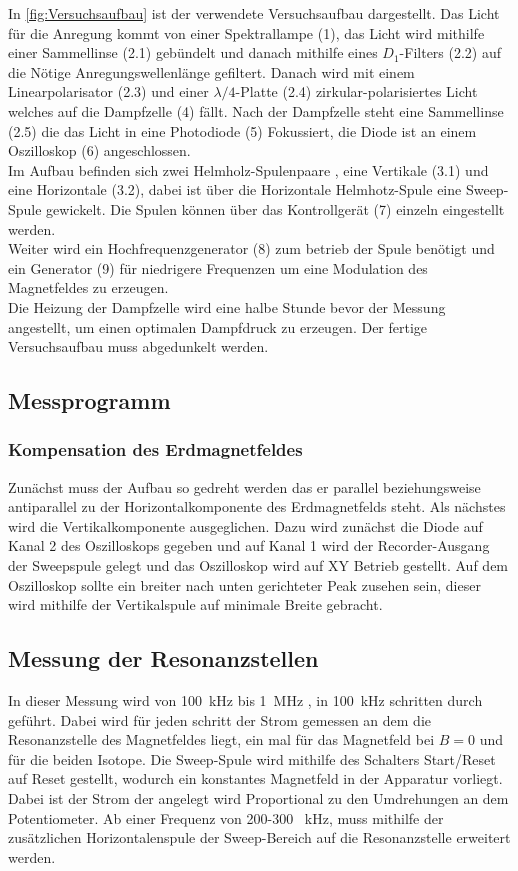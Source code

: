In \cref{fig:Versuchsaufbau} ist der verwendete Versuchsaufbau dargestellt.
Das Licht für die Anregung kommt von einer Spektrallampe (1), das Licht wird mithilfe einer Sammellinse (2.1) gebündelt und danach mithilfe eines $D_1$-Filters (2.2) auf die Nötige Anregungswellenlänge gefiltert. 
Danach wird mit einem Linearpolarisator (2.3) und einer $\lambda/4$-Platte (2.4) zirkular-polarisiertes Licht welches auf die Dampfzelle (4) fällt. Nach der Dampfzelle steht eine Sammellinse (2.5) die das Licht in eine Photodiode (5) Fokussiert, die Diode ist an einem Oszilloskop (6) angeschlossen.\\
Im Aufbau befinden sich zwei Helmholz-Spulenpaare , eine Vertikale (3.1) und eine Horizontale (3.2), dabei ist über die Horizontale Helmhotz-Spule eine Sweep-Spule gewickelt.
Die Spulen können über das Kontrollgerät (7) einzeln eingestellt werden.\\
Weiter wird ein Hochfrequenzgenerator (8) zum betrieb der Spule benötigt und ein Generator (9) für niedrigere Frequenzen um eine Modulation des Magnetfeldes zu erzeugen.\\
Die Heizung der Dampfzelle wird eine halbe Stunde bevor der Messung angestellt, um einen optimalen Dampfdruck zu erzeugen.
Der fertige Versuchsaufbau muss abgedunkelt werden.\\
\subsection{Messprogramm}
\subsubsection{Kompensation des Erdmagnetfeldes}
Zunächst muss der Aufbau so gedreht werden das er parallel beziehungsweise antiparallel zu der Horizontalkomponente des Erdmagnetfelds steht. 
Als nächstes wird die Vertikalkomponente ausgeglichen.
Dazu wird zunächst die Diode auf Kanal 2 des Oszilloskops gegeben und auf Kanal 1 wird der Recorder-Ausgang der Sweepspule gelegt und das Oszilloskop wird auf XY Betrieb gestellt.
Auf dem Oszilloskop sollte ein breiter nach unten gerichteter Peak zusehen sein, dieser wird mithilfe der Vertikalspule auf minimale Breite gebracht.
\subsection{Messung der Resonanzstellen}
In dieser Messung wird von \SI{100}{\kilo\hertz} bis \SI{1}{\mega\hertz} , in \SI{100}{\kilo\hertz} schritten durch geführt.
Dabei wird für jeden schritt der Strom gemessen an dem die Resonanzstelle des Magnetfeldes liegt, ein mal für das Magnetfeld bei $B=0$ und für die beiden Isotope.
Die Sweep-Spule wird mithilfe des Schalters Start/Reset auf Reset gestellt, wodurch ein konstantes Magnetfeld in der Apparatur vorliegt.
Dabei ist der Strom der angelegt wird Proportional zu den Umdrehungen an dem Potentiometer.
Ab einer Frequenz von 200-300 \SI{}{\kilo\hertz}, muss mithilfe der zusätzlichen Horizontalenspule der Sweep-Bereich auf die Resonanzstelle erweitert werden.
\newpage
